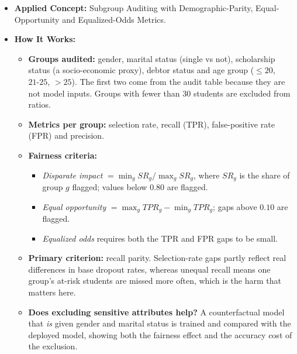 \documentclass[11pt]{article}
\providecommand{\tightlist}{%
      \setlength{\itemsep}{0pt}\setlength{\parskip}{0pt}}
\begin{document}
\begin{itemize}
\tightlist
\item
  \textbf{Applied Concept:} Subgroup Auditing with Demographic-Parity,
  Equal-Opportunity and Equalized-Odds Metrics.
\item
  \textbf{How It Works:}

  \begin{itemize}
  \tightlist
  \item
    \textbf{Groups audited:} gender, marital status (single vs not),
    scholarship status (a socio-economic proxy), debtor status and age
    group (\(\le 20\), \(21\text{-}25\), \(> 25\)). The first two come
    from the audit table because they are not model inputs. Groups with
    fewer than \(30\) students are excluded from ratios.
  \item
    \textbf{Metrics per group:} selection rate, recall (TPR),
    false-positive rate (FPR) and precision.
  \item
    \textbf{Fairness criteria:}

    \begin{itemize}
    \tightlist
    \item
      \emph{Disparate impact} \(= \min_g SR_g / \max_g SR_g\), where
      \(SR_g\) is the share of group \(g\) flagged; values below
      \(0.80\) are flagged.
    \item
      \emph{Equal opportunity} \(= \max_g TPR_g - \min_g TPR_g\); gaps
      above \(0.10\) are flagged.
    \item
      \emph{Equalized odds} requires both the TPR and FPR gaps to be
      small.
    \end{itemize}
  \item
    \textbf{Primary criterion:} recall parity. Selection-rate gaps
    partly reflect real differences in base dropout rates, whereas
    unequal recall means one group's at-risk students are missed more
    often, which is the harm that matters here.
  \item
    \textbf{Does excluding sensitive attributes help?} A counterfactual
    model that \emph{is} given gender and marital status is trained and
    compared with the deployed model, showing both the fairness effect
    and the accuracy cost of the exclusion.
  \end{itemize}
\end{itemize}
\end{document}
